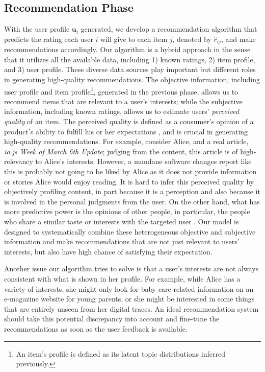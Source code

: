 \documentclass[conference]{IEEEtran}
\begin{document}
\subsection{Recommendation Phase}
With the user profile $\mathbf{u}_i$ generated, we develop a recommendation algorithm that predicts the rating each user $i$ will give to each item $j$, denoted by $\hat{r}_{ij}$, and make recommendations accordingly. Our algorithm is a hybrid approach in the sense that it utilizes all the available data, including 1) known ratings, 2) item profile, and 3) user profile. These diverse data sources play important but different roles in generating high-quality recommendations. The objective information, including user profile and item profile\footnote{An item's profile is defined as its latent topic distributions inferred previously.}, generated in the previous phase, allows us to recommend items that are relevant to a user's interests; while the subjective information, including known ratings, allows us to estimate users' \textit{perceived quality} of an item. The perceived quality is defined as a consumer's opinion of a product's ability to fulfill his or her expectations \cite{jacoby1971price}, and is crucial in generating high-quality recommendations. For example, consider Alice, and a real article, \textit{io.js Week of March 6th Update}; judging from the content, this article is of high-relevancy to Alice's interests. However, a mundane software changes report like this is probably not going to be liked by Alice as it does not provide information or stories Alice would enjoy reading. It is hard to infer this perceived quality by objectively profiling content, in part because it is a perception and also because it is involved in the personal judgments from the user. On the other hand, what has more predictive power is the opinions of other people, in particular, the people who share a similar taste or interests with the targeted user \cite{Su:2009:SCF:1592474.1722966,}. Our model is designed to systematically combine these heterogeneous objective and subjective information and make recommendations that are not just relevant to users' interests, but also have high chance of satisfying their expectation.

Another issue our algorithm tries to solve is that a user's interests are not always consistent with what is shown in her profile. For example, while Alice has a variety of interests, she might only look for baby-care-related information on an e-magazine website for young parents, or she might be interested in some things that are entirely unseen from her digital traces. An ideal recommendation system should take this potential discrepancy into account and fine-tune the recommendations as soon as the user feedback is available. 
\end{document}
